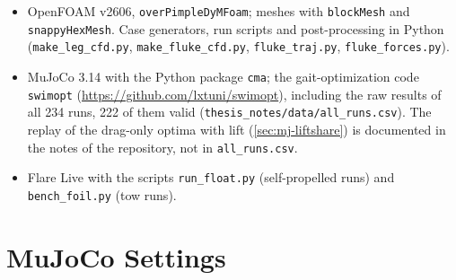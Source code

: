 \begin{sloppypar}
\begin{itemize}
  \item OpenFOAM v2606, \texttt{overPimpleDyMFoam}; meshes with \texttt{blockMesh} and \texttt{snappyHexMesh}. Case generators,
        run scripts and post-processing in Python (\texttt{make\_leg\_cfd.py}, \texttt{make\_fluke\_cfd.py},
        \texttt{fluke\_traj.py}, \texttt{fluke\_forces.py}).
  \item MuJoCo 3.14 with the Python package \texttt{cma}; the gait-optimization code \texttt{swimopt} (\url{https://github.com/lxtuni/swimopt}), including the raw results of all
        234 runs, 222 of them valid (\texttt{thesis\_notes/data/all\_runs.csv}). The replay of the drag-only optima with lift
        (\cref{sec:mj-liftshare}) is documented in the notes of the repository, not in \texttt{all\_runs.csv}.
  \item Flare Live with the scripts \texttt{run\_float.py} (self-propelled runs) and \texttt{bench\_foil.py} (tow runs).
\end{itemize}
\end{sloppypar}

\section{MuJoCo Settings}

